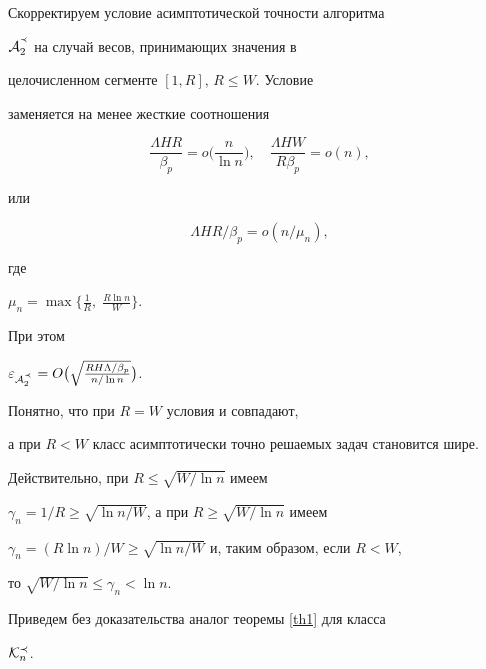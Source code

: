 \begin{notenonum}


Скорректируем условие асимптотической точности алгоритма


${\cal A}_{2}^{^{\prec}}$ на случай весов, принимающих значения в 


целочисленном сегменте $[1,R]$, $R \le W$. Условие 


заменяется на менее жесткие соотношения


$$


\frac {\Lambda HR}{\beta_{p}} = o \biggl(\frac {n}{\ln n}\biggr),


\quad \frac {\Lambda HW}{R\beta_{p}} = o(n),


$$


или


\begin{equation}


\label{e18}


\Lambda HR/ \beta_{p} = o(n/\mu_{n}),


\end{equation}


где


$\mu_{n} = \max \bigl\{ \frac {1}{R},\; \frac {R\ln n}{W} \bigr\}$.


При этом 


$\eps_{{\cal A}_{2}^{^{\prec}}}=


O\bigl(\sqrt {\frac {RH\Lambda / \beta_{p}}{n/\ln n}} \bigr)$.





Понятно, что при $R=W$ условия  и  совпадают, 


а при $R<W$ класс асимптотически точно решаемых задач становится шире. 


Действительно, при $R \le \sqrt {W/\ln n}$ имеем 


$\gamma_{n} = 1/R \ge \sqrt {\ln n/W}$, а при $R \ge \sqrt {W/\ln n}$ имеем


$\gamma_{n} = (R\ln n)/W \ge \sqrt {\ln n/W}$ и, таким образом, если $R<W$,


то $\sqrt {W/\ln n} \le \gamma_{n}< \ln n$.


\end{notenonum}





Приведем без доказательства аналог теоремы \ref {th1} для класса


${\cal K}_{n}^{\prec}$.





